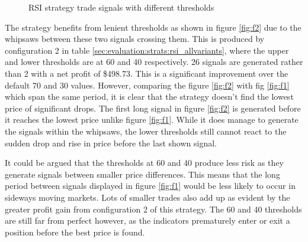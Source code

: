 \begin{figure}[ht]
  \centering
  \hfill
  \caption{RSI strategy trade signals with different thresholds}
  \label{fig:eval:strats:rsi_signals}
\end{figure}

The strategy benefits from lenient thresholds as shown in figure \ref{fig:f2} due to the whipsaws between these two signals crossing them. This is produced by configuration 2 in table \ref{sec:evaluation:strats:rsi_allvariants}, where the upper and lower thresholds are at 60 and 40 respectively. 26 signals are generated rather than 2 with a net profit of \$498.73. This is a significant improvement over the default 70 and 30 values. However, comparing the figure \ref{fig:f2} with fig \ref{fig:f1} which span the same period, it is clear that the strategy doesn't find the lowest price of significant drops. The first long signal in figure \ref{fig:f2} is generated before it reaches the lowest price unlike figure \ref{fig:f1}. While it does manage to generate the signals within the whipsaws, the lower thresholds still cannot react to the sudden drop and rise in price before the last shown signal.

It could be argued that the thresholds at 60 and 40 produce less risk as they generate signals between smaller price differences. This means that the long period between signals displayed in figure \ref{fig:f1} would be less likely to occur in sideways moving markets. Lots of smaller trades also add up as evident by the greater profit gain from configuration 2 of this strategy. The 60 and 40 thresholds are still far from perfect however, as the indicators prematurely enter or exit a position before the best price is found.



